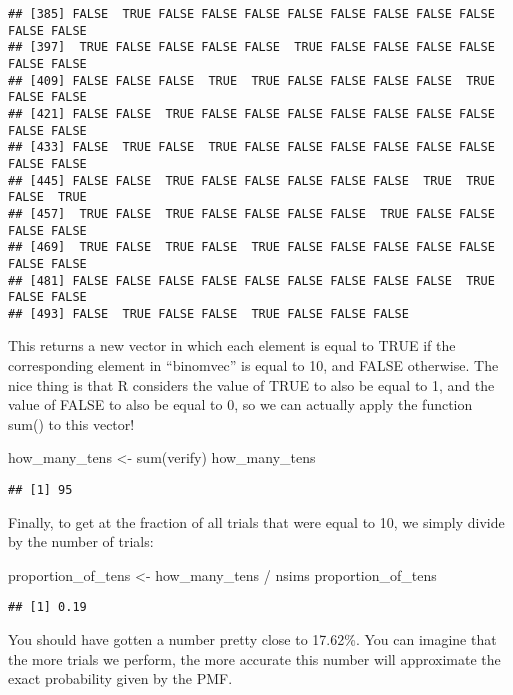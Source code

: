 \documentclass[
]{book}
\newenvironment{Shaded}{\begin{snugshade}}{\end{snugshade}}
\newcommand{\FunctionTok}[1]{\textcolor[rgb]{0.00,0.00,0.00}{#1}}
\newcommand{\NormalTok}[1]{#1}
\newcommand{\OtherTok}[1]{\textcolor[rgb]{0.56,0.35,0.01}{#1}}
\newcommand{\SpecialCharTok}[1]{\textcolor[rgb]{0.00,0.00,0.00}{#1}}
\begin{document}
\begin{verbatim}
## [385] FALSE  TRUE FALSE FALSE FALSE FALSE FALSE FALSE FALSE FALSE FALSE FALSE
## [397]  TRUE FALSE FALSE FALSE FALSE  TRUE FALSE FALSE FALSE FALSE FALSE FALSE
## [409] FALSE FALSE FALSE  TRUE  TRUE FALSE FALSE FALSE FALSE  TRUE FALSE FALSE
## [421] FALSE FALSE  TRUE FALSE FALSE FALSE FALSE FALSE FALSE FALSE FALSE FALSE
## [433] FALSE  TRUE FALSE  TRUE FALSE FALSE FALSE FALSE FALSE FALSE FALSE FALSE
## [445] FALSE FALSE  TRUE FALSE FALSE FALSE FALSE FALSE  TRUE  TRUE FALSE  TRUE
## [457]  TRUE FALSE  TRUE FALSE FALSE FALSE FALSE  TRUE FALSE FALSE FALSE FALSE
## [469]  TRUE FALSE  TRUE FALSE  TRUE FALSE FALSE FALSE FALSE FALSE FALSE FALSE
## [481] FALSE FALSE FALSE FALSE FALSE FALSE FALSE FALSE FALSE  TRUE FALSE FALSE
## [493] FALSE  TRUE FALSE FALSE  TRUE FALSE FALSE FALSE
\end{verbatim}

This returns a new vector in which each element is equal to TRUE if the corresponding element in ``binomvec'' is equal to 10, and FALSE otherwise. The nice thing is that R considers the value of TRUE to also be equal to 1, and the value of FALSE to also be equal to 0, so we can actually apply the function sum() to this vector!

\begin{Shaded}
\begin{Highlighting}[]
\NormalTok{how\_many\_tens }\OtherTok{\textless{}{-}} \FunctionTok{sum}\NormalTok{(verify)}
\NormalTok{how\_many\_tens}
\end{Highlighting}
\end{Shaded}

\begin{verbatim}
## [1] 95
\end{verbatim}

Finally, to get at the fraction of all trials that were equal to 10, we simply divide by the number of trials:

\begin{Shaded}
\begin{Highlighting}[]
\NormalTok{proportion\_of\_tens }\OtherTok{\textless{}{-}}\NormalTok{ how\_many\_tens }\SpecialCharTok{/}\NormalTok{ nsims}
\NormalTok{proportion\_of\_tens}
\end{Highlighting}
\end{Shaded}

\begin{verbatim}
## [1] 0.19
\end{verbatim}

You should have gotten a number pretty close to 17.62\%. You can imagine that the more trials we perform, the more accurate this number will approximate the exact probability given by the PMF.
\end{document}

